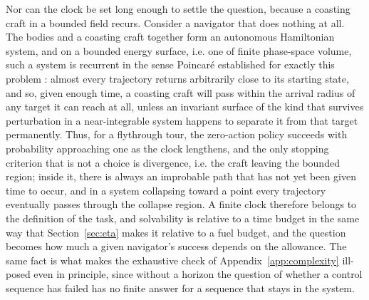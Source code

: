 Nor can the clock be set long enough to settle the question, because a
coasting craft in a bounded field recurs. Consider a navigator that does nothing at all. The bodies and a coasting
craft together form an autonomous Hamiltonian system, and on a bounded
energy surface, i.e. one of finite phase-space volume, such a system is
recurrent in the sense Poincar\'e established for exactly this problem
\cite{poincare1890}: almost every trajectory returns arbitrarily close to
its starting state, and so, given enough time, a coasting craft will pass
within the arrival radius of any target it can reach at all, unless an
invariant surface of the kind that survives perturbation in a near-integrable
system \cite{kolmogorov1954,arnold1963} happens to separate it from that
target permanently. Thus, for a flythrough tour, the zero-action policy
succeeds with probability approaching one as the clock lengthens, and the
only stopping criterion that is not a choice is divergence, i.e. the craft
leaving the bounded region; inside it, there is always an improbable path
that has not yet been given time to occur, and in a system collapsing toward a point every trajectory eventually
passes through the collapse region. A
finite clock therefore belongs to the definition of the task, and
solvability is relative to a time budget in the same way that
Section~\ref{sec:eta} makes it relative to a fuel budget, and the question
becomes how much a given navigator's success depends on the allowance. The
same fact is what makes the exhaustive check of Appendix~\ref{app:complexity}
ill-posed even in principle, since without a horizon the question of whether
a control sequence has failed has no finite answer for a sequence that stays
in the system.

